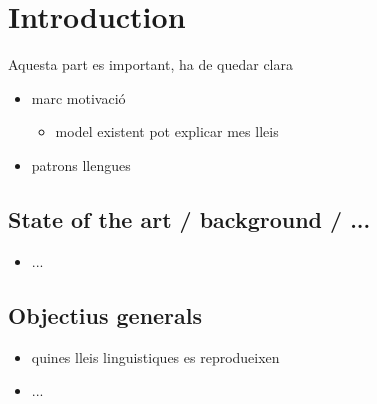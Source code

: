 \chapter{Introduction}
\label{cha:introduction}
Aquesta part es important, ha de quedar clara
\begin{itemize}
\item marc motivació
  \begin{itemize}
  \item model existent pot explicar mes lleis
  \end{itemize}
\item patrons llengues
\end{itemize}
\section{State of the art / background / ...}
\begin{itemize}
\item ...
\end{itemize}
\section{Objectius generals}
\begin{itemize}
\item quines lleis linguistiques es reprodueixen
\item ...
\end{itemize}
